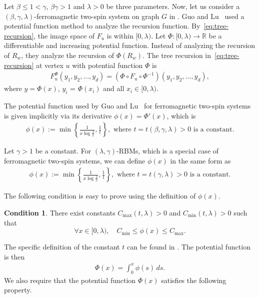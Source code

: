 \documentclass[11pt]{amsart}
\newcommand{\defeq}{:=}
\theoremstyle{definition}
\newtheorem{condition}[theorem]{Condition}
\theoremstyle{remark}
\begin{document}
Let $\beta \leq 1 < \gamma$, $\beta \gamma > 1$ and $\lambda >0$ be three parameters. 
Now, let us consider a $(\beta,\gamma,\lambda)$-ferromagnetic two-spin system on graph $G$ in .
Guo and Lu~\cite{GuoL18} used a potential function method to analyze the recursion function. 
By~\eqref{eq:tree-recursion}, the image space of $F_u$ is within $[0,\lambda)$.
Let $\Phi: [0,\lambda) \to \mathbb{R}$ be a differentiable and increasing potential function. Instead of analyzing the recursion of $R_w$, they analyze the recursion of $\Phi(R_w)$.
The tree recursion in~\eqref{eq:tree-recursion} at vertex $u$ with potential function $\Phi$ is
\begin{align*}
F^\Phi_u (y_1,y_2,\ldots,y_d) = (\Phi \circ F_u \circ \Phi^{-1})(y_1,y_2,\ldots,y_d),
\end{align*}
where $y= \Phi(x)$, $y_i$ = $\Phi(x_i)$ and all $x_i \in [0,\lambda)$.

The potential function used by Guo and Lu~\cite{GuoL18} for ferromagnetic two-spin systems is given implicitly via its derivative $\phi(x) = \Phi'(x)$,
which is
\begin{align}\label{eq:phi-definition}
  \phi(x)\defeq \min\left \{\frac{1}{x\log\frac{\lambda}{x}},\frac{1}{t}\right \}, \text{ where } t = t(\beta,\gamma,\lambda) > 0\text{ is a constant}.
\end{align}

Let $\gamma > 1$ be a constant. For $(\lambda,\gamma)$-RBMs, which is a special case of ferromagnetic two-spin systems, we can define $\phi(x)$ in the same form as
\begin{align}\label{eq:phi-definition-1}
    \phi(x)\defeq \min\left \{\frac{1}{x\log\frac{\lambda}{x}},\frac{1}{t}\right \}, \text{ where } t = t(\gamma,\lambda) > 0\text{ is a constant}.
\end{align}

The following condition is easy to prove using the definition of $\phi(x)$.
\begin{condition}\label{condition:phi-bound}
There exist constants $C_{\max}(t,\lambda) > 0$ and $C_{\min}(t,\lambda) > 0$ such that
$$\forall x \in [0,\lambda), \quad C_{\min} \leq \phi(x) \leq C_{\max}.$$
\end{condition}

The specific definition of the constant $t$ can be found in \cite{GuoL18}. The potential function is then
\begin{align}\label{eq:Phi-definition}
  \Phi(x) = \int_0^x \phi(s)\, ds.
\end{align}
We also require that the potential function $\Phi(x)$ satisfies the following property.
\end{document}
